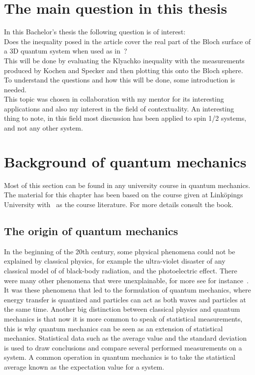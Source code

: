 \documentclass[
  utf8,%
  parskip,%
  largesmallcaps,intlimits,widermath,%
  sharecounter,nobreak,definition=marks,%
  noparts%
]{rtthesis}
\begin{document}
\section{The main question in this thesis}
In this Bachelor's thesis the following question is of interest:\\
Does the inequality posed in the article \cite{PhysRevLett.101.020403} cover the real
part of the Bloch surface of a 3D quantum system when used as in~\cite{Kochen1968The}?\\
This will be done by evaluating the Klyachko inequality with the measurements produced by Kochen and Specker and then plotting this onto the Bloch sphere.
To understand the questions and how this will be done, some introduction is needed.\\
This topic was chosen in collaboration with my mentor for its interesting applications and also my interest in the field of contextuality. An interesting thing to note, in this field most discussion has been applied to spin 1/2 systems, and not any other system.
\section{Background of quantum mechanics}\label{sec:intro:Background of quantum mechanics}
Most of this section can be found in any university course in quantum mechanics. The material for this chapter has been based on the course given at Linköpings University with~\cite{Bransden:2000}
as the course literature. For more details consult the book. 
\subsection{The origin of quantum mechanics}
In the beginning of the 20th century, some physical phenomena could not be explained by classical physics, for example the ultra-violet disaster of any classical model of of black-body radiation, and the photoelectric effect. There were many other phenomena that were unexplainable, for more see for instance~\cite{Bransden:2000}.
It was these phenomena that led to the formulation of quantum mechanics, where energy transfer is quantized and particles can act as both waves and particles at the same time. Another big distinction between classical physics and quantum mechanics is that now it is more common to speak of statistical measurements, this is why quantum mechanics can be seen as an extension of statistical mechanics.
Statistical data such as the average value and the standard deviation is used to draw conclusions and compare several performed measurements on a system. A common operation in quantum mechanics is to take the statistical average known as the expectation value for a system.    
\end{document}
